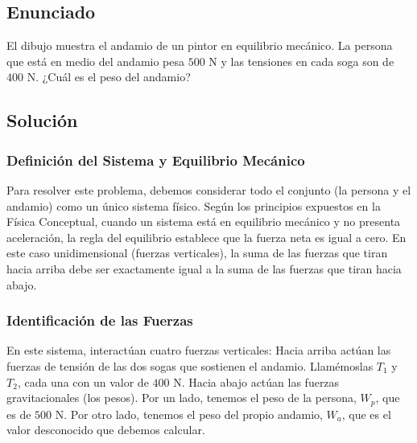\documentclass[12pt,letterpaper]{article}
\begin{document}
\newpage

\subsection*{Enunciado}
El dibujo muestra el andamio de un pintor en equilibrio mecánico. La persona que está en medio del andamio pesa $500\text{ N}$ y las tensiones en cada soga son de $400\text{ N}$. ¿Cuál es el peso del andamio?

\begin{center}
\end{center}

\subsection*{Solución}

\subsubsection*{Definición del Sistema y Equilibrio Mecánico}
Para resolver este problema, debemos considerar todo el conjunto (la persona y el andamio) como un único sistema físico. Según los principios expuestos en la Física Conceptual, cuando un sistema está en equilibrio mecánico y no presenta aceleración, la regla del equilibrio establece que la fuerza neta es igual a cero. En este caso unidimensional (fuerzas verticales), la suma de las fuerzas que tiran hacia arriba debe ser exactamente igual a la suma de las fuerzas que tiran hacia abajo.

\subsubsection*{Identificación de las Fuerzas}
En este sistema, interactúan cuatro fuerzas verticales:
Hacia arriba actúan las fuerzas de tensión de las dos sogas que sostienen el andamio. Llamémoslas $T_{1}$ y $T_{2}$, cada una con un valor de $400\text{ N}$.
Hacia abajo actúan las fuerzas gravitacionales (los pesos). Por un lado, tenemos el peso de la persona, $W_{p}$, que es de $500\text{ N}$. Por otro lado, tenemos el peso del propio andamio, $W_{a}$, que es el valor desconocido que debemos calcular.
\end{document}
